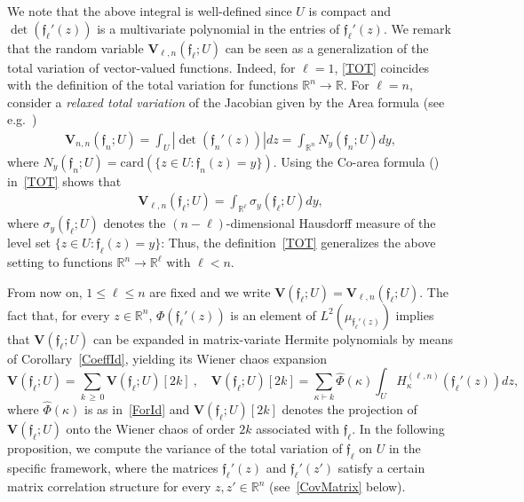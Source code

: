 \documentclass[AHL,Unicode,longabstracts,published]{cedram}
\newcommand{\card}{\mathrm{card}}
\newcommand{\bfv}{\mathbf{V}}
\newcommand{\frkf}{\mathfrak{f}}
\newcommand{\R}{\mathbb{R}}
\begin{document}
We note that the above integral is well-defined since $U$ is compact and $\det(\frkf_{\ell}'(z)) $ is a multivariate polynomial in the entries of $\frkf_{\ell}'(z)$. We remark that the random variable $\bfv_{\ell,n}(\frkf_{\ell};U)$ can be seen as a generalization of the total variation of vector-valued functions. Indeed, for $\ell=1$, \eqref{TOT} coincides with the definition of the total variation for functions $\R^n \to \R$. For $\ell=n$, \cite{Guido,Fonseca} consider a \emph{relaxed total variation} of the Jacobian given by the Area formula (see e.g.~\cite[Proposition~6.1]{AW09})
\begin{gather*}
\bfv_{n,n}(\frkf_n;U) = \int_{U} \left|\det\left(\frkf_n'(z)\right)\right| dz = \int_{\R^n} N_y(\frkf_n;U) dy,
\end{gather*}
where $N_y(\frkf_n;U)=\card(\{z \in U: \frkf_n(z)=y\})$. Using the Co-area formula (\cite[Proposition~6.13]{AW09}) in~\eqref{TOT} shows that
\begin{gather*}
\bfv_{\ell,n}(\frkf_{\ell};U) = \int_{\R^{\ell}} \sigma_y(\frkf_{\ell};U) dy,
\end{gather*}
where $\sigma_y(\frkf_{\ell};U) $ denotes the $(n-\ell)$-dimensional Hausdorff measure of the level set $\{z\in U: \frkf_{\ell}(z) = y\}$: Thus, the definition~\eqref{TOT} generalizes the above setting to functions $\R^n \to \R^{\ell}$ with $\ell<n$.

From now on, $1\leq\ell\leq n$ are fixed and we write $\bfv(\frkf_{\ell};U)=\bfv_{\ell,n}(\frkf_{\ell};U)$. The fact that, for every $z\in \R^n$, $\Phi(\frkf_{\ell}'(z))$ is an element of $L^2(\mu_{\frkf_{\ell}'(z)})$ implies that $\bfv(\frkf_{\ell};U)$ can be expanded in matrix-variate Hermite polynomials by means of Corollary~\ref{CoeffId}, yielding its Wiener chaos expansion
\begin{equation}\label{chaos}
\bfv\left(\frkf_{\ell};U\right) = \sum_{k\,\geq\,0} \bfv\left(\frkf_{\ell};U\right)[2k] \ ,
\quad \bfv\left(\frkf_{\ell};U\right)[2k] = \sum_{\kappa \vdash k} \widehat{\Phi}(\kappa) \int_U H_{\kappa}^{(\ell,n)}\left(\frkf_{\ell}'(z)\right)dz,
\end{equation}
where $\widehat{\Phi}(\kappa)$ is as in~\eqref{ForId} and $\bfv(\frkf_{\ell};U)[2k]$ denotes the projection of $\bfv(\frkf_{\ell};U)$ onto the Wiener chaos of order $2k$ associated with $\frkf_{\ell}$. In the following proposition, we compute the variance of the total variation of $\frkf_{\ell}$ on $U$ in the specific framework, where the matrices $\frkf_{\ell}'(z)$ and $\frkf_{\ell}'(z')$ satisfy a certain matrix correlation structure for every $z,z'\in \R^n$ (see~\eqref{CovMatrix} below).
\end{document}
